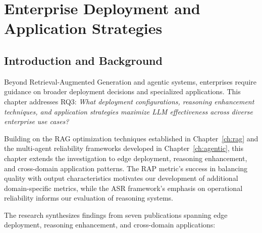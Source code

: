 \chapter{Enterprise Deployment and Application Strategies}
\label{ch:strategies}

\section{Introduction and Background}
\label{sec:deployment_intro}

Beyond Retrieval-Augmented Generation and agentic systems, enterprises require guidance on broader deployment decisions and specialized applications. This chapter addresses RQ3: \textit{What deployment configurations, reasoning enhancement techniques, and application strategies maximize LLM effectiveness across diverse enterprise use cases?}

Building on the RAG optimization techniques established in Chapter~\ref{ch:rag} and the multi-agent reliability frameworks developed in Chapter~\ref{ch:agentic}, this chapter extends the investigation to edge deployment, reasoning enhancement, and cross-domain application patterns. The RAP metric's success in balancing quality with output characteristics motivates our development of additional domain-specific metrics, while the ASR framework's emphasis on operational reliability informs our evaluation of reasoning systems.

The research synthesizes findings from seven publications spanning edge deployment, reasoning enhancement, and cross-domain applications:

